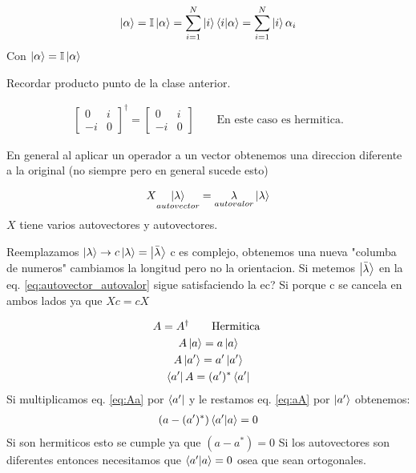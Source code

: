 \documentclass{article}
\newcommand{\caja}[3]{%
  \begin{tcolorbox}[colback=#1!5!white,colframe=#1!25!black,title=#2]
    #3
  \end{tcolorbox}%
}
\begin{document}
\caja{green}{Operador identidad (Completez)}{
  \begin{gather}
    \ket{\alpha} = \mathbb{I} \ket{\alpha}
    = \sum_{i = 1 }^{N }\ket{i }\bra{i }\ket{\alpha}
    = \sum_{i = 1 }^{N }\ket{i }\alpha_i
  \end{gather}
  Con $ \ket{\alpha} = \mathbb{I } \ket{\alpha} $

  Recordar producto punto de la clase anterior.
}
\caja{black}{Titulo}{
  \begin{gather}
     \begin{bmatrix}
         0 & i \\
         -i  & 0
     \end{bmatrix} ^\dag  = 
     \begin{bmatrix}
         0 & i \\
         -i  & 0
     \end{bmatrix} \qquad \text{En este caso es hermitica.}  
  \end{gather}
}

En general al aplicar un operador a un vector obtenemos una direccion diferente a la original (no siempre pero en general sucede esto) 

\caja{red}{Autovalores y autovectores }{
  \begin{gather}
    X \underset{autovector}{\ket{\lambda}} = \underset{autovalor}{\lambda} \ket{\lambda} 
    \label{eq:autovector_autovalor}
  \end{gather}
  $ X  $ tiene varios autovectores y autovectores. 
}
\caja{green}{No importa la longitud}{
  Reemplazamos $ \ket{\lambda} \rightarrow c \ket{\lambda} = \ket{\bar \lambda}  $ c es complejo, obtenemos una nueva "columba de numeros" cambiamos la longitud pero no la orientacion. Si metemos $ \ket{\bar \lambda } $ en la eq. \ref{eq:autovector_autovalor} sigue satisfaciendo la ec? Si porque c se cancela en ambos lados ya que $ X c = cX $
}
\begin{gather}
   A = A ^ {\dag} \qquad \text{Hermitica }\\
   A \ket{a} = a \ket{a}\label{eq:Aa}\\
   A \ket{a'} = a' \ket{a'}\label{eq:Aap}\\
   \bra{a' }A = (a')^* \bra{a' } \label{eq:aA}
\end{gather}
Si multiplicamos eq. \ref{eq:Aa} por $ \bra{a' } $ y le restamos eq. \ref{eq:aA} por $ \ket{a'} $ obtenemos: 
\begin{gather}
  (a-(a')^*)\bra{a' }\ket{a} = 0 
  \label{eq:Aa-aA}
\end{gather}
Si son hermiticos esto se cumple ya que $ (a-a^*) =0 $ 
Si los autovectores son diferentes entonces necesitamos que $ \bra{a'}\ket{a}=0   $ osea que sean ortogonales. 
\end{document}
